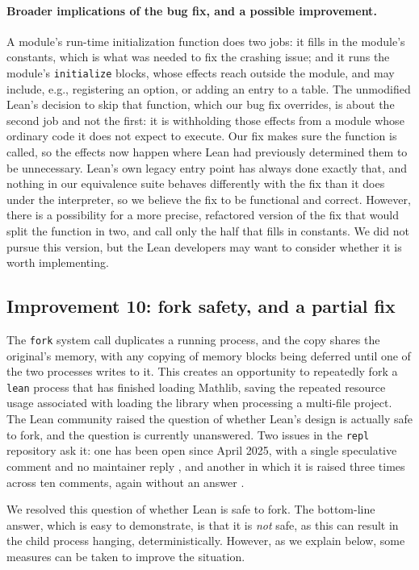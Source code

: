 \documentclass{article}
\newcommand{\Lean}{Lean\xspace}      %
\newcommand{\lean}{\texttt{lean}\xspace}      %
\newcommand{\mathlib}{Mathlib\xspace}
\begin{document}
\paragraph{Broader implications of the bug fix, and a possible improvement.}
A module's run-time initialization function does two jobs: it fills in the module's constants, which is what was needed to fix the crashing issue; and it runs the module's \texttt{initialize} blocks, whose effects reach outside the module, and may include, e.g., registering an option, or adding an entry to a table. The unmodified \Lean's decision to skip that function, which our bug fix overrides, is about the second job and not the first: it is withholding those effects from a module whose ordinary code it does not expect to execute. Our fix makes sure the function is called, so the effects now happen where \Lean had previously determined them to be unnecessary. \Lean's own legacy entry point has always done exactly that, and nothing in our equivalence suite behaves differently with the fix than it does under the interpreter, so we believe the fix to be functional and correct. However, there is a possibility for a more precise, refactored version of the fix that would split the function in two, and call only the half that fills in constants. We did not pursue this version, but the \Lean developers may want to consider whether it is worth implementing.

\subsection{Improvement 10: fork safety, and a partial fix}
\label{sec:tn-10}

The \texttt{fork} system call duplicates a running process, and the copy shares the original's memory, with any copying of memory blocks being deferred until one of the two processes writes to it. This creates an opportunity to repeatedly fork a \lean process that has finished loading \mathlib, saving the repeated resource usage associated with loading the library when processing a multi-file project. The \Lean community raised the question of whether \Lean's design is actually safe to fork, and the question is currently unanswered. Two issues in the \texttt{repl} repository ask it: one has been open since April 2025, with a single speculative comment and no maintainer reply \cite{repl87}, and another in which it is raised three times across ten comments, again without an answer \cite{repl84}. 

We resolved this question of whether \Lean is safe to fork. The bottom-line answer, which is easy to demonstrate, is that it is \emph{not} safe, as this can result in the child process hanging, deterministically. However, as we explain below, some measures can be taken to improve the situation.
\end{document}
